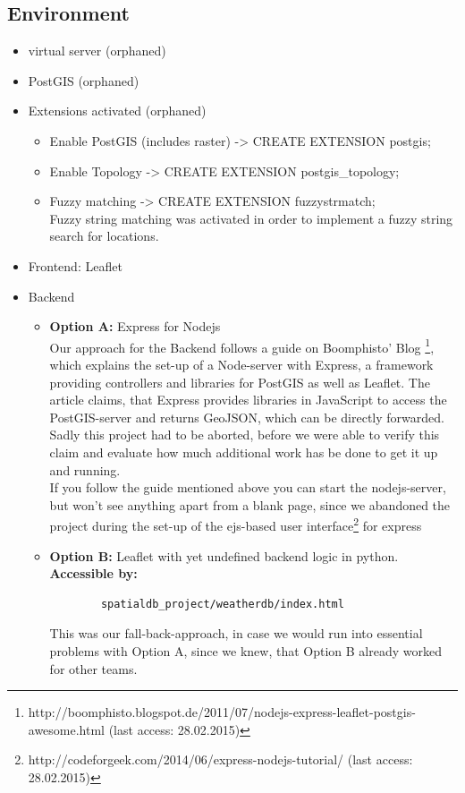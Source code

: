 \documentclass[paper=a4, fontsize=11pt]{article} %
\numberwithin{equation}{section} %
\numberwithin{figure}{section} %
\numberwithin{table}{section} %
\begin{document}
\subsection{Environment}
\begin{itemize}
	\item virtual server (orphaned)
    \item PostGIS (orphaned)
    \item Extensions activated (orphaned)
    \begin{itemize}
    	\item Enable PostGIS (includes raster) -> CREATE EXTENSION postgis;
   		\item Enable Topology -> CREATE EXTENSION postgis\_topology;
    	\item Fuzzy matching -> CREATE EXTENSION fuzzystrmatch;\\
    	Fuzzy string matching was activated in order to implement a fuzzy string search for locations.
    \end{itemize}
    \item Frontend: Leaflet
    \item Backend
     \begin{itemize}
    	\item \textbf{Option A:} Express for Nodejs\\ [0.1cm]
    	Our approach for the Backend follows a guide on Boomphisto' Blog
    	\footnote{http://boomphisto.blogspot.de/2011/07/nodejs-express-leaflet-postgis-awesome.html (last access: 28.02.2015)}, which explains the set-up of a Node-server with Express, a framework providing controllers and libraries for PostGIS as well as Leaflet.
    	The article claims, that Express provides libraries in JavaScript to access the PostGIS-server and returns GeoJSON, which can be directly forwarded.\\ Sadly this project had to be aborted, before we were able to verify this claim and evaluate how much additional work has be done to get it up and running.\\
    	If you follow the guide mentioned above you can start the nodejs-server, but won't see anything apart from a blank page, since we abandoned the project during the set-up of the ejs-based user interface\footnote{http://codeforgeek.com/2014/06/express-nodejs-tutorial/ (last access: 28.02.2015)} for express 
   		\item \textbf{Option B:} Leaflet with yet undefined backend logic in python.\\ [0.1cm]
   		\textbf {Accessible by:}
   		\begin{lstlisting}
   		spatialdb_project/weatherdb/index.html
   		\end{lstlisting}
   		This was our fall-back-approach, in case we would run into essential problems with Option A, since we knew, that Option B already worked for other teams.
    \end{itemize}
\end{itemize}
\end{document}
